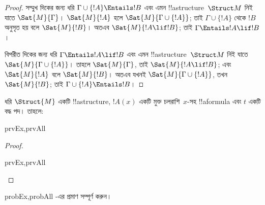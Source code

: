 \documentclass[../../../include/open-logic-section]{subfiles}
\begin{document}
\begin{proof}
সম্মুখ দিকের জন্য ধরি $\Gamma \cup \{ !A \} \Entails !B$ এবং এমন
!!a{structure}~$\Struct M$ নিই যাতে $\Sat{M}{\Gamma}$।
$\Sat{M}{!A}$ হলে $\Sat{M}{\Gamma \cup \{ !A \} }$; তাই
$\Gamma \cup \{ !A \}$ থেকে $!B$ অনুসৃত হয় বলে $\Sat{M}{!B}$।
অতএব $\Sat{M}{!A \lif !B}$; তাই $\Gamma \Entails !A \lif !B$।

বিপরীত দিকের জন্য ধরি $\Gamma \Entails !A \lif !B$ এবং এমন
!!a{structure}~$\Struct M$ নিই যাতে $\Sat{M}{\Gamma \cup \{ !A
  \}}$। তাহলে $\Sat{M}{\Gamma}$, তাই $\Sat{M}{!A \lif !B}$; এবং
$\Sat{M}{!A}$ বলে $\Sat{M}{!B}$। অতএব যখনই
$\Sat{M}{\Gamma \cup \{ !A \} }$, তখন $\Sat{M}{!B}$; তাই
$\Gamma \cup \{ !A \} \Entails !B$।
\end{proof}

\begin{prop}
  ধরি $\Struct{M}$ একটি !!a{structure}, $!A(x)$ একটি মুক্ত চলরাশি~$x$-সহ
  !!a{formula} এবং $t$ একটি বদ্ধ পদ। তাহলে:
  \begin{tagenumerate}{prvEx,prvAll}
  \end{tagenumerate}
\end{prop}

\begin{proof}
  \begin{tagenumerate}{prvEx,prvAll}
  \end{tagenumerate}
\end{proof}

\begin{probtag}{probEx,probAll}
  -এর প্রমাণ সম্পূর্ণ করুন।
\end{probtag}
\end{document}
